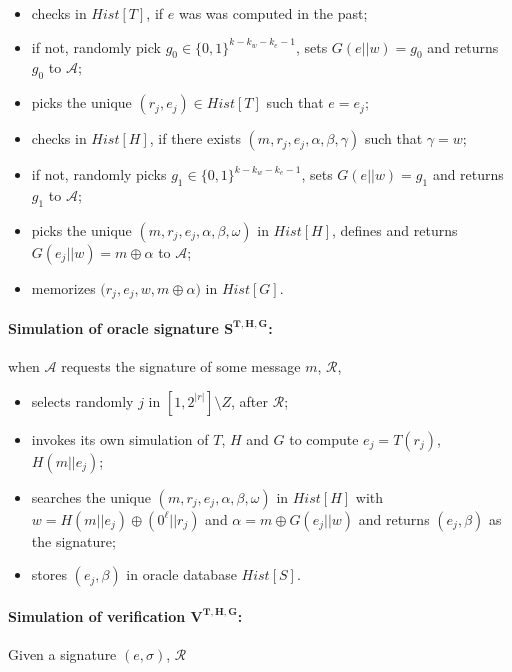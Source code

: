 \documentclass[a4paper,11pt]{article}
\begin{document}
\begin{itemize}
 \item checks in $Hist [T]$, if $e$ was was computed in the past;
\item if not, randomly pick $g_{0}\in\{0,1\}^{k-k_w-k_e-1}$, sets  $G(e||w) =g_{0}$ and  returns $g_0$ to $\mathcal{A}$;
 \item picks the unique $(r_{j},e_{j}) \in Hist[T]$ such that $e=e_{j}$;
\item checks in $Hist[H]$, if there exists $(m, r_{j},  e_{j},  \alpha, \beta, \gamma)$ such that $\gamma=w$;
\item if not, randomly picks $g_{1}\in\{0,1\}^{k-k_w-k_e-1}$, sets $G(e||w) =g_{1}$ and returns $g_1$ to $\mathcal{A}$;

 \item  picks the unique $(m, r_{j},  e_{j},  \alpha, \beta, \omega)$ in $Hist [H]$, defines and returns  $G(e_{j}||w) =m\oplus \alpha$ to $\mathcal{A}$;
\item     memorizes $\big(r_{j}, e_{j}, w, m\oplus \alpha\big)$ in $Hist [G]$.
\end{itemize}


\paragraph{Simulation of oracle signature $\mathbf{S^{T,H,G}}$:} when $\mathcal{A }$ requests the signature of some message $m$, $\mathcal{R}$,
   \begin{itemize}
\item selects  randomly $j$ in $[1,2^{|r|}]\setminus Z$, after  $\mathcal{R}$;
 \item invokes its own simulation of $T$, $H$ and $G$ to compute $e_{j}=T(r_{j})$, $H(m||e_{j})$;

  \item searches the unique $(m, r_{j},  e_{j},  \alpha, \beta, \omega)$ in $Hist [H]$ with $w =H(m||e_{j})\oplus (0^{\ell}||r_{j})$ and $\alpha  =m\oplus G(e_{j}||w)$ and returns $(e_{j},\beta) $ as the signature;

  \item  stores $(e_{j},\beta) $ in oracle database $Hist [S]$.
\end{itemize}


\paragraph{Simulation of verification $\mathbf{ V^{T,H,G}}$:} Given a signature $(e, \sigma)$, $\mathcal{R}$
\end{document}
